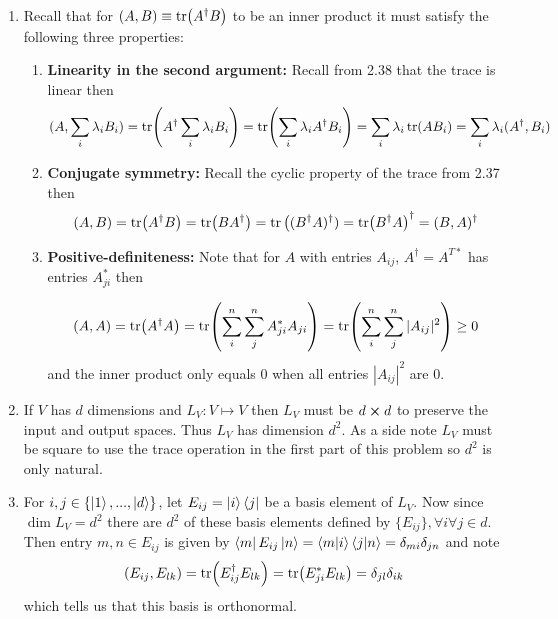 \documentclass[12pt]{exam}
\newcounter{problem}[section]
\begin{document}
\begin{solution}
    \begin{enumerate}[(1)]
        \item Recall that for $(A,B) \equiv \tr(A^\dagger B)$ to be an inner product it must satisfy the following three properties: 
        \begin{enumerate}
            \item \textbf{Linearity in the second argument:} Recall from 2.38 that the trace is linear then  
            $$
            (A,\sum_i\lambda_i B_i) = \tr(A^\dagger \sum_i\lambda_i B_i) = \tr(\sum_i\lambda_i A^\dagger B_i)=\sum_i\lambda_i \tr(A B_i) = \sum_i\lambda_i (A^\dagger, B_i)
            $$

            \item \textbf{Conjugate symmetry:} Recall the cyclic property of the trace from 2.37 then 
            $$
            (A,B) = \tr (A^\dagger B) = \tr(BA^\dagger) = \tr\big( (B^\dagger A)^\dagger) = \tr (B^\dagger A)^\dagger = (B, A)^\dagger
            $$

            \item \textbf{Positive-definiteness:} Note that for $A$ with entries $A_{ij}$, $A^\dagger = A^{T*}$ has entries $A_{ji}^*$ then 
            
            $$
            (A,A) = \tr(A^\dagger A ) = \tr(\sum_i^n\sum_j^n A_{ji}^* A_{ji} ) = \tr (\sum_i^n\sum_j^n |A_{ij}|^2) \geq 0$$ 
            and the inner product only equals 0 when all entries $|A_{ij}|^2$ are 0.
        \end{enumerate}

        \item If $V$ has $d$ dimensions and $L_V: V \mapsto V$ then $L_V$ must be $d \cross d$ to preserve the input and output spaces. Thus $L_V$ has dimension $d^2$. As a side note $L_V$ must be square to use the trace operation in the first part of this problem so $d^2$ is only natural.

        \item For $i,j \in \{\ket{1},...,\ket{d}\}$, let $E_{ij} = \ket{i}\bra{j}$ be a basis element of $L_V$. Now since $\dim L_V=d^2$ there are $d^2$ of these basis elements defined by $\{E_{ij}\},\forall i \forall j\in d$. Then entry $m,n\in E_{ij}$ is given by $\bra{m}E_{ij}\ket{n} = \braket{m}{i}\braket{j}{n} = \delta_{mi}\delta_{jn}$ and note $$(E_{ij},E_{lk})=\tr(E_{ij}^\dagger E_{lk})=\tr(E_{ji}^* E_{lk})=\delta_{jl}\delta_{ik}$$ which tells us that this basis is orthonormal. 


\end{enumerate}
\end{solution}
\end{document}
